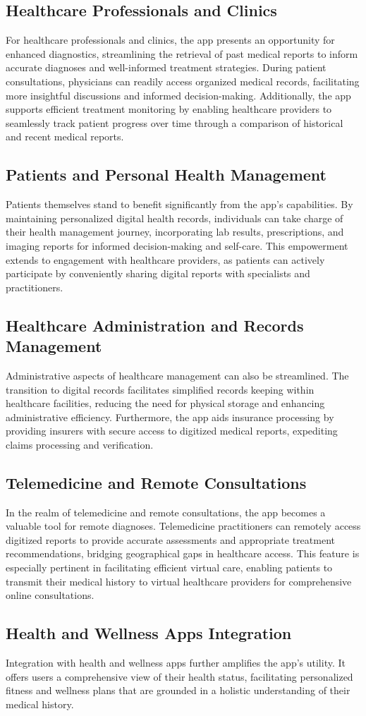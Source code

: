 \subsection*{Healthcare Professionals and Clinics} 
For healthcare professionals and clinics, the app presents an opportunity for enhanced diagnostics, streamlining the retrieval of past medical reports to inform accurate diagnoses and well-informed treatment strategies. During patient consultations, physicians can readily access organized medical records, facilitating more insightful discussions and informed decision-making. Additionally, the app supports efficient treatment monitoring by enabling healthcare providers to seamlessly track patient progress over time through a comparison of historical and recent medical reports.
\subsection*{Patients and Personal Health Management}
Patients themselves stand to benefit significantly from the app's capabilities. By maintaining personalized digital health records, individuals can take charge of their health management journey, incorporating lab results, prescriptions, and imaging reports for informed decision-making and self-care. This empowerment extends to engagement with healthcare providers, as patients can actively participate by conveniently sharing digital reports with specialists and practitioners.
\subsection*{Healthcare Administration and Records Management}
Administrative aspects of healthcare management can also be streamlined. The transition to digital records facilitates simplified records keeping within healthcare facilities, reducing the need for physical storage and enhancing administrative efficiency. Furthermore, the app aids insurance processing by providing insurers with secure access to digitized medical reports, expediting claims processing and verification.
\subsection*{Telemedicine and Remote Consultations}
In the realm of telemedicine and remote consultations, the app becomes a valuable tool for remote diagnoses. Telemedicine practitioners can remotely access digitized reports to provide accurate assessments and appropriate treatment recommendations, bridging geographical gaps in healthcare access. This feature is especially pertinent in facilitating efficient virtual care, enabling patients to transmit their medical history to virtual healthcare providers for comprehensive online consultations.
\subsection*{Health and Wellness Apps Integration}
Integration with health and wellness apps further amplifies the app's utility. It offers users a comprehensive view of their health status, facilitating personalized fitness and wellness plans that are grounded in a holistic understanding of their medical history.
